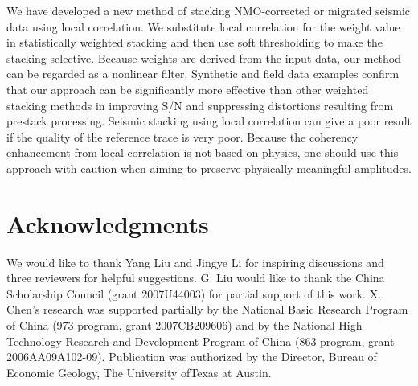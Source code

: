 We have developed a new method of stacking NMO-corrected or migrated seismic 
data using local correlation. We substitute local correlation for the weight 
value in statistically weighted stacking and then use soft thresholding
to make the stacking selective. Because weights are derived from the input 
data, our method can be regarded as a nonlinear filter. Synthetic and
field data examples confirm that our approach can be significantly more 
effective than other weighted stacking methods in improving S/N and suppressing
distortions resulting from prestack processing. Seismic stacking using local 
correlation can give a poor result if the quality of the reference trace is 
very poor. Because the coherency enhancement from local correlation is not 
based on physics, one should use this approach with caution when aiming to 
preserve physically meaningful amplitudes.


\section{Acknowledgments}

We would like to thank Yang Liu and Jingye Li for inspiring discussions and 
three reviewers for helpful suggestions. G. Liu would like to thank the China 
Scholarship Council (grant 2007U44003) for partial support of this work. X.
Chen’s research was supported partially by the National Basic Research Program 
of China (973 program, grant 2007CB209606) and by the National High Technology 
Research and Development Program of China (863 program, grant 2006AA09A102-09).
Publication was authorized by the Director, Bureau of Economic Geology, The 
University ofTexas at Austin.




